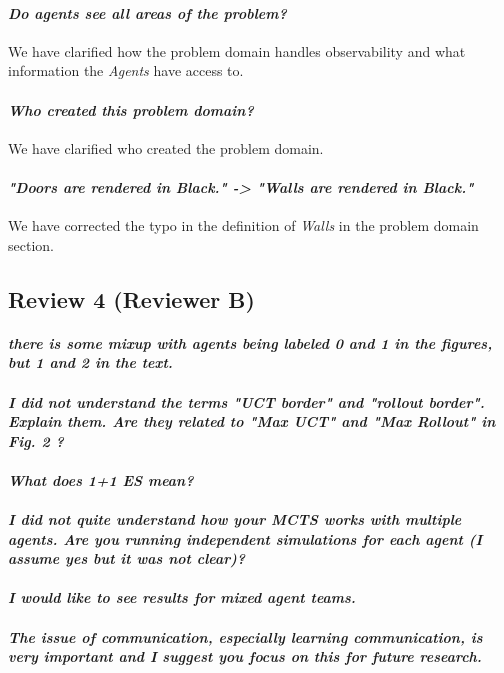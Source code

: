 \documentclass{article}
\begin{document}
\paragraph*{\textit{Do agents see all areas of the problem?}}
We have clarified how the problem domain handles observability and what information the \emph{Agents} have access to.
\paragraph*{\textit{Who created this problem domain?}}
We have clarified who created the problem domain.
\paragraph*{\textit{"Doors are rendered in Black." -> "Walls are rendered in Black."}}
We have corrected the typo in the definition of \emph{Walls} in the problem domain section.
\subsection{Review 4 (Reviewer B)}
\paragraph*{\textit{there is some mixup with agents being labeled 0 and 1 in the figures, but 1 and 2 in the text.}}

\paragraph*{\textit{I did not understand the terms "UCT border" and "rollout border". Explain them. Are they related to "Max UCT" and "Max Rollout" in Fig. 2 ?}}
\paragraph*{\textit{What does 1+1 ES mean?}}
\paragraph*{\textit{I did not quite understand how your MCTS works with multiple agents. Are you running independent simulations for each agent (I assume yes but it was not clear)? }}
\paragraph*{\textit{I would like to see results for mixed agent teams.}}
\paragraph*{\textit{The issue of communication, especially learning communication, is very important and I suggest you focus on this for future research.}}
\end{document}
